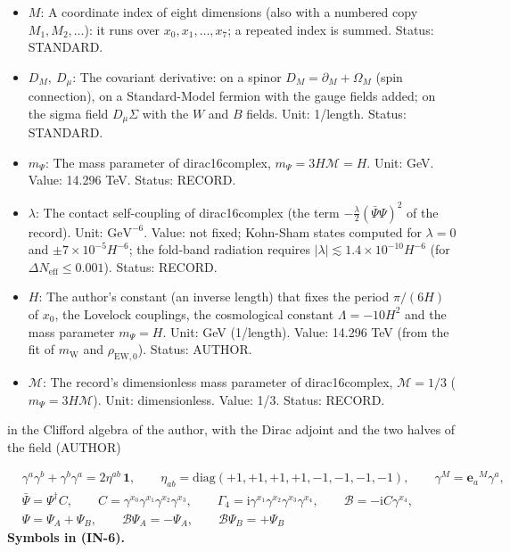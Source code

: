 \documentclass[
  10pt,
]{article}
\begin{document}
\begin{itemize}
  \(\gamma^a,\ \gamma^M,\ \gamma^\mu\): The Dirac matrices: \(\gamma^a\)
  with a frame index are the author's real \(16 \times 16\) matrices of
  the Clifford algebra of signature \((4, 4)\);
  \(\gamma^M = \mathbf{e}_a{}^M\gamma^a\) along a coordinate
  (\(\gamma^{x_0}\), \(\gamma^{x_4}\), \ldots{} the matrices along
  \(x_0\), \(x_4\), \ldots), \(\gamma_M = g_{MN}\gamma^N\);
  \(\gamma^\mu\) the matrices of the four observable directions in
  four-dimensional formulas. Unit: dimensionless. Status: AUTHOR.
\item
  \(M\): A coordinate index of eight dimensions (also with a numbered
  copy \(M_1, M_2, \dots\)): it runs over \(x_0, x_1, \dots, x_7\); a
  repeated index is summed. Status: STANDARD.
\item
  \(D_M,\ D_\mu\): The covariant derivative: on a spinor
  \(D_M = \partial_M + \Omega_M\) (spin connection), on a Standard-Model
  fermion with the gauge fields added; on the sigma field
  \(D_\mu\Sigma\) with the \(W\) and \(B\) fields. Unit: 1/length.
  Status: STANDARD.
\item
  \(m_\Psi\): The mass parameter of dirac16complex,
  \(m_\Psi = 3H\mathcal{M} = H\). Unit: GeV. Value: 14.296 TeV. Status:
  RECORD.
\item
  \(\lambda\): The contact self-coupling of dirac16complex (the term
  \(-\frac{\lambda}{2}(\bar\Psi\Psi)^2\) of the record). Unit:
  \(\mathrm{GeV}^{-6}\). Value: not fixed; Kohn-Sham states computed for
  \(\lambda = 0\) and \(\pm7\times10^{-5}H^{-6}\); the fold-band
  radiation requires
  \(\lvert\lambda\rvert \lesssim 1.4\times10^{-10}H^{-6}\) (for
  \(\Delta N_{\mathrm{eff}} \le 0.001\)). Status: RECORD.
\item
  \(H\): The author's constant (an inverse length) that fixes the period
  \(\pi/(6H)\) of \(x_0\), the Lovelock couplings, the cosmological
  constant \(\Lambda = -10H^2\) and the mass parameter \(m_\Psi = H\).
  Unit: GeV (1/length). Value: 14.296 TeV (from the fit of
  \(m_{\mathrm{W}}\) and \(\rho_{\mathrm{EW},0}\)). Status: AUTHOR.
\item
  \(\mathcal{M}\): The record's dimensionless mass parameter of
  dirac16complex, \(\mathcal{M} = 1/3\) (\(m_\Psi = 3H\mathcal{M}\)).
  Unit: dimensionless. Value: 1/3. Status: RECORD.
\end{itemize}

in the Clifford algebra of the author, with the Dirac adjoint and the
two halves of the field (AUTHOR)

\[
\begin{aligned}
&\gamma^a\gamma^b + \gamma^b\gamma^a = 2\eta^{ab}\,\mathbf{1},\qquad
 \eta_{ab} = \mathrm{diag}(+1, +1, +1, +1, -1, -1, -1, -1),\qquad \gamma^M = \mathbf{e}_a{}^M\gamma^a,\\
&\bar\Psi = \Psi^\dagger C,\qquad C = \gamma^{x_0}\gamma^{x_1}\gamma^{x_2}\gamma^{x_3},\qquad
 \Gamma_4 = \mathrm{i}\gamma^{x_1}\gamma^{x_2}\gamma^{x_3}\gamma^{x_4},\qquad \mathcal{B} =
 -\mathrm{i}C\gamma^{x_4},\\
&\Psi = \Psi_A + \Psi_B,\qquad \mathcal{B}\Psi_A = -\Psi_A,\qquad \mathcal{B}\Psi_B = +\Psi_B
\end{aligned} \tag{IN-6}
\] \textbf{Symbols in (IN-6).}
\end{document}
